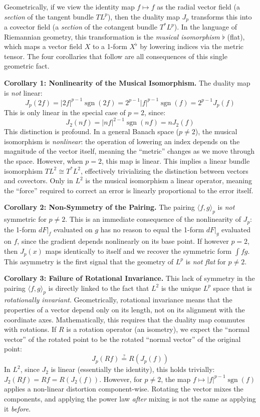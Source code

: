 \documentclass{article}
\newcommand{\sgn}{{\operatorname{sgn}}}
\begin{document}
Geometrically, if we view the identity map $f \mapsto f$ as the radial vector
field (a \emph{section} of the tangent bundle $TL^p$), then the duality map $J_p$ transforms this into a
covector field (a \emph{section} of the cotangent bundle $T^*L^p$). In the language of Riemannian geometry,
this transformation is the \emph{musical isomorphism} $\flat$ (flat), which maps a vector field $X$ to a
1-form $X^\flat$ by lowering indices via the metric tensor. The four corollaries that follow are all
consequences of this single geometric fact.

\medskip\noindent\textbf{Corollary 1: Nonlinearity of the Musical Isomorphism.}\quad
The duality map is \emph{not} linear:
\[
	J_p(2f) = |2f|^{p-1}\sgn(2f) = 2^{p-1}|f|^{p-1}\sgn(f) = 2^{p-1}J_p(f)
\]
This is only linear in the special case of $p =2$, since:
\[
	J_2(nf) = |nf|^{2-1}\sgn(nf) = n J_2(f)
\]
This distinction is profound. In a general Banach space ($p \neq 2$), the musical isomorphism is
\emph{nonlinear}: the operation of lowering an index depends on the magnitude of the vector itself, meaning
the ``metric'' changes as we move through the space. However, when $p=2$, this map is linear. This implies a
linear bundle isomorphism $TL^2 \cong T^*L^2$, effectively trivializing the distinction between vectors and
covectors. Only in $L^2$ is the musical isomorphism a linear operator, meaning the ``force'' required to
correct an error is linearly proportional to the error itself.

\medskip\noindent\textbf{Corollary 2: Non-Symmetry of the Pairing.}\quad
The pairing $\langle f, g \rangle_p$ is \emph{not} symmetric for $p \neq 2$. This is an immediate consequence
of the nonlinearity of $J_p$: the 1-form $dF|_f$ evaluated on $g$ has no reason to equal the 1-form $dF|_g$
evaluated on $f$, since the gradient depends nonlinearly on its base point. If however $p = 2$, then
$J_p(x)$ maps identically to itself and we recover the symmetric form $\int fg$. This asymmetry is
the first signal that the geometry of $L^p$ is \emph{not flat} for $p \ne 2$.

\medskip\noindent\textbf{Corollary 3: Failure of Rotational Invariance.}\quad
This lack of symmetry in the pairing $\langle f,g \rangle_p$ is directly linked to the fact that $L^2$ is the
unique $L^p$ space that is \emph{rotationally invariant}. Geometrically, rotational invariance means that the
properties of a vector depend only on its length, not on its alignment with the coordinate axes.
Mathematically, this requires that the duality map commutes with rotations. If $R$ is a rotation operator
(an isometry), we expect the ``normal vector'' of the rotated point to be the rotated ``normal
vector'' of the original point:
\[
	J_p(Rf) \overset{?}{=} R(J_p(f))
\]
In $L^2$, since $J_2$ is linear (essentially the identity), this holds trivially: $J_2(Rf) = Rf = R(J_2(f))$.
However, for $p \ne 2$, the map $f \mapsto |f|^{p-1}\sgn(f)$ applies a non-linear distortion component-wise.
Rotating the vector mixes the components, and applying the power law \emph{after} mixing is not the same as
applying it \emph{before}.
\end{document}
